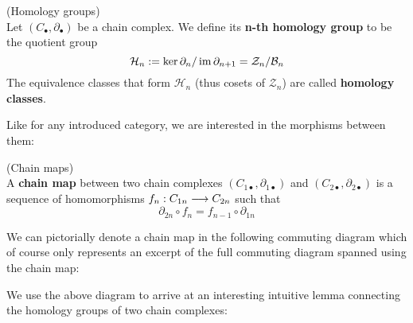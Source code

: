 \begin{definition}
\label{def:Homology}
(Homology groups)\\
  Let $(C_\bullet, \partial_\bullet)$ be a chain complex. We define its \textbf{n-th homology group} to be the quotient group
  $$ \mathcal{H}_n := \ker\partial_n / \operatorname{im} \partial_{n+1} = \mathcal{Z}_n / \mathcal{B}_n $$
  The equivalence classes that form $\mathcal{H}_n$ (thus cosets of $\mathcal{Z}_n$) are called \textbf{homology classes}.
\end{definition}

Like for any introduced category, we are interested in the morphisms between them:

\begin{definition}
\label{def:chain_map}
(Chain maps)\\
  A \textbf{chain map} between two chain complexes $(C_{1\bullet}, \partial_{1\bullet})$ and $(C_{2\bullet}, \partial_{2\bullet})$ is a sequence of homomorphisms $f_n: C_{1n} \longrightarrow C_{2n}$ such that
  $$ \partial_{2n} \circ f_n = f_{n-1} \circ \partial_{1n} $$
\end{definition}

We can pictorially denote a chain map in the following commuting diagram which of course only represents an excerpt of the full commuting diagram spanned using the chain map:

\begin{center}
\end{center}


We use the above diagram to arrive at an interesting intuitive lemma connecting the homology groups of two chain complexes:

